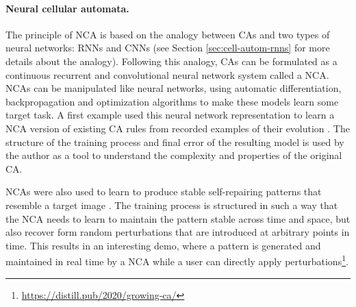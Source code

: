 \paragraph{Neural cellular automata\label{sec:neur-cell-autom}.}
The principle of \ac{NCA} is based on the analogy between \acp{CA} and two types
of neural networks: \acp{RNN} and \acp{CNN} (see Section
\ref{sec:cell-autom-rnns} for more details about the analogy). Following this
analogy, \acp{CA} can be formulated as a continuous recurrent and convolutional
neural network system called a \ac{NCA}. \acp{NCA} can be manipulated like
neural networks, using automatic differentiation, backpropagation and
optimization algorithms to make these models learn some target task. A first
example used this neural network representation to learn a \ac{NCA} version of
existing \ac{CA} rules from recorded examples of their evolution
\parencite{gilpinCellularAutomataConvolutional2018}. The structure of the
training process and final error of the resulting model is used by the author as
a tool to understand the complexity and properties of the original \ac{CA}.

\acp{NCA} were also used to learn to produce stable self-repairing patterns that
resemble a target image \parencite{mordvintsevGrowingNeuralCellular2020}. The
training process is structured in such a way that the \ac{NCA} needs to learn to
maintain the pattern stable across time and space, but also recover form random
perturbations that are introduced at arbitrary points in time. This results in
an interesting demo, where a pattern is generated and maintained in real time by
a \ac{NCA} while a user can directly apply
perturbations\footnote{\url{https://distill.pub/2020/growing-ca/}}.

